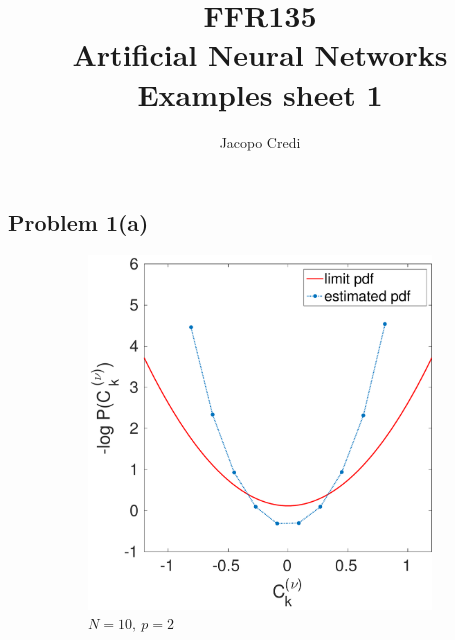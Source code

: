 \documentclass[12pt,A4,titlepage]{article}
\author{Jacopo Credi}
\title{FFR135\\Artificial Neural Networks\\ \bigskip Examples sheet 1}
\begin{document}
\parindent=0cm
\maketitle

\subsection*{Problem 1(a)}


\begin{figure}[H]
 \centering
    \begin{subfigure}[b]{0.32\textwidth}
        \includegraphics[width=\textwidth]{figures/fig_1a_1.pdf}
        \caption{$N = 10, \ p = 2$}
        \label{1a1}
    \end{subfigure}
    	\hfill
    \begin{subfigure}[b]{0.32\textwidth}

\end{subfigure}
\end{figure}
\end{document}
